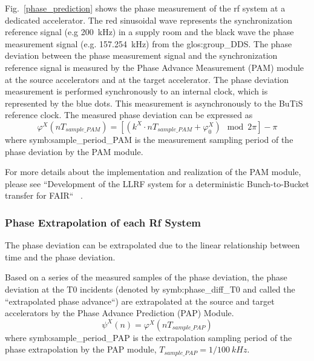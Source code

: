 Fig.~\ref{phase_prediction} shows the phase measurement of the rf system at a dedicated accelerator. The red sinusoidal wave represents the synchronization reference signal (e.g \SI{200}{kHz}) in a supply room and the black wave the phase measurement signal (e.g. \SI{157.254}{kHz}) from the \gls{glos:group_DDS}. The phase deviation between the phase measurement signal and the synchronization reference signal is measured by the Phase Advance Measurement (\gls{PAM}) module at the source accelerators and at the target accelerator. The phase deviation measurement is performed synchronously to an internal clock, which is represented by the blue dots. This measurement is asynchronously to the BuTiS reference clock. The measured phase deviation can be expressed as
\begin{equation}
\varphi^X(nT_\mathit{sample\_PAM})=[( k^\mathit{X}\cdot nT_\mathit{sample\_PAM}+\varphi^X_0) \mod 2\pi ]-\pi
\end{equation}
where \gls{symb:sample_period_PAM} is the measurement sampling period of the phase deviation by the PAM module.

For more details about the implementation and realization of the PAM module, please see ``Development of the LLRF system for a deterministic Bunch-to-Bucket transfer for FAIR`` ~\cite{ferrand_development_nodate}. 
\subsubsection{Phase Extrapolation of each Rf System}
The phase deviation can be extrapolated due to the linear relationship between time and the phase deviation. 

Based on a series of the measured samples of the phase deviation, the phase deviation at the T0 incidents (denoted by \gls{symb:phase_diff_T0} and called the ``extrapolated phase advance``) are extrapolated at the source and target accelerators by the Phase Advance Prediction (\gls{PAP}) Module.
\begin{equation}
\psi^\mathit{X}(n)=\varphi^X(nT_\mathit{sample\_PAP})
\end{equation}
where \gls{symb:sample_period_PAP} is the extrapolation sampling period of the phase extrapolation by the PAP module, $T_\mathit{sample\_PAP}=1/\SI{100}{kHz}$.

